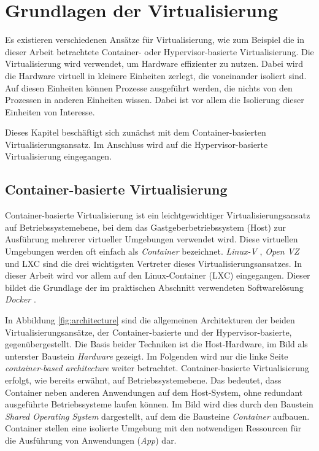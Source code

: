 \thispagestyle{empty}

\section{Grundlagen der Virtualisierung}
\label{Grundlagen der Virtualisierung}
Es existieren verschiedenen Ansätze für Virtualisierung, wie zum Beispiel die in dieser Arbeit betrachtete Container- oder Hypervisor-basierte Virtualisierung. Die Virtualisierung wird verwendet, um Hardware effizienter zu nutzen. Dabei wird die Hardware virtuell in kleinere Einheiten zerlegt, die voneinander isoliert sind. Auf diesen Einheiten können Prozesse ausgeführt werden, die nichts von den Prozessen in anderen Einheiten wissen. Dabei ist vor allem die Isolierung dieser Einheiten von Interesse.

Dieses Kapitel beschäftigt sich zunächst mit dem Container-basierten Virtualisierungsansatz. Im Anschluss wird auf die Hypervisor-basierte Virtualisierung eingegangen. 

\subsection{Container-basierte Virtualisierung}
Container-basierte Virtualisierung ist ein leichtgewichtiger Virtualisierungsansatz auf Betriebssystemebene, bei dem das  Gastgeberbetriebssystem (Host) zur Ausführung mehrerer virtueller Umgebungen verwendet wird. Diese virtuellen Umgebungen werden oft einfach als \emph{Container} bezeichnet. \emph{Linux-V} \cite{Overview2018PaperLinux-VServer}, \emph{Open VZ} \cite{IndexOpenvz.org} und \ac{LXC} \cite{IndexLinuxcontainers.Org} sind die drei wichtigsten Vertreter dieses Virtualisierungsansatzes. In dieser Arbeit wird vor allem auf den Linux-Container (LXC) eingegangen. Dieser bildet die Grundlage der im praktischen Abschnitt verwendeten Softwarelösung \emph{Docker} \cite{MeineDockerPlatform}. 

In Abbildung \ref{fig:architecture} sind die allgemeinen Architekturen der beiden Virtualisierungsansätze, der Container-basierte und der Hypervisor-basierte, gegenübergestellt. Die Basis beider Techniken ist die Host-Hardware, im Bild als unterster Baustein \emph{Hardware} gezeigt. Im Folgenden wird nur die linke Seite \emph{container-based architecture} weiter betrachtet. Container-basierte Virtualisierung erfolgt, wie bereits erwähnt, auf Betriebssystemebene. Das bedeutet, dass Container neben anderen Anwendungen auf dem Host-System, ohne redundant ausgeführte Betriebssysteme laufen können. Im Bild wird dies durch den Baustein \emph{Shared Operating System} dargestellt, auf dem die Bausteine \emph{Container} aufbauen. 
Container stellen eine isolierte Umgebung mit den notwendigen Ressourcen für die Ausführung von Anwendungen (\emph{App}) dar. 

